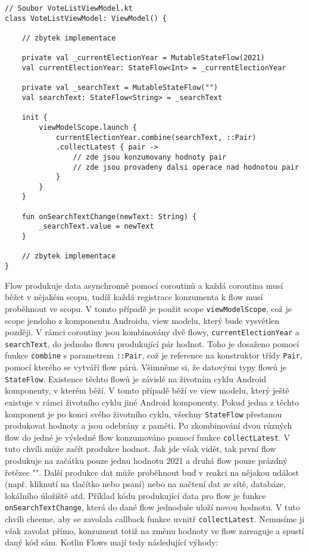 \begin{lstlisting}[caption={Příklad použití flow}, label={lst:flow-general}, tabsize=2]
// Soubor VoteListViewModel.kt
class VoteListViewModel: ViewModel() {
	
	// zbytek implementace
	
	private val _currentElectionYear = MutableStateFlow(2021)	
	val currentElectionYear: StateFlow<Int> = _currentElectionYear
	
	private val _searchText = MutableStateFlow("")
	val searchText: StateFlow<String> = _searchText
	
	init {
		viewModelScope.launch {
			currentElectionYear.combine(searchText, ::Pair)
			.collectLatest { pair ->
				// zde jsou konzumovany hodnoty pair
				// zde jsou provadeny dalsi operace nad hodnotou pair
			}
		}
	}

	fun onSearchTextChange(newText: String) {
		_searchText.value = newText
	}

	// zbytek implementace
}
\end{lstlisting}

\noindent Flow produkuje data asynchronně pomocí coroutinů a každá coroutina musí běžet v nějakém scopu, tudíž každá registrace konzumenta k flow musí proběhnout ve scopu. V tomto případě je použit scope \lstinline|viewModelScope|, což je scope jendoho z komponentu Androidu, view modelu, který bude vysvětlen později. V rámci coroutiny jsou kombinovány dvě flowy, \lstinline|currentElectionYear| a \lstinline|searchText|, do jednoho flowu produkující pár hodnot. Toho je dosaženo pomocí funkce \lstinline|combine| s parametrem \lstinline|::Pair|, což je reference na konstruktor třídy \lstinline|Pair|, pomocí kterého se vytváří flow párů. Všimněme si, že datovými typy flowů je \lstinline|StateFlow|. Existence těchto flowů je závislé na životním cyklu Android komponenty, v kterém běží. V tomto případě běží ve view modelu, který ještě existuje v rámci životního cyklu jiné Android komponenty. Pokud jedna z těchto komponent je po konci svého životního cyklu, všechny \lstinline|StateFlow| přestanou produkovat hodnoty a jsou odebrány z paměti. Po zkombinování dvou různých flow do jedné je výsledné flow konzumováno pomocí funkce \lstinline|collectLatest|. V tuto chvíli může začít produkce hodnot. Jak jde však vidět, tak první flow produkuje na začátku pouze jednu hodnotu 2021 a druhá flow pouze prázdný řetězec "". Další produkce dat může proběhnout buď v reakci na nějakou událost (např. kliknutí na tlačítko nebo psaní) nebo na načtení dat ze sítě, databáze, lokálního úložiště atd. Příklad kódu produkující data pro flow je funkce \lstinline|onSearchTextChange|, která do dané flow jednoduše uloží novou hodnotu. V tuto chvíli chceme, aby se zavolala callback funkce uvnitř \lstinline|collectLatest|. Nemusíme ji však zavolat přímo, konzument totiž na změnu hodnoty ve flow zareaguje a spustí daný kód sám. Kotlin Flows mají tedy následující výhody:

